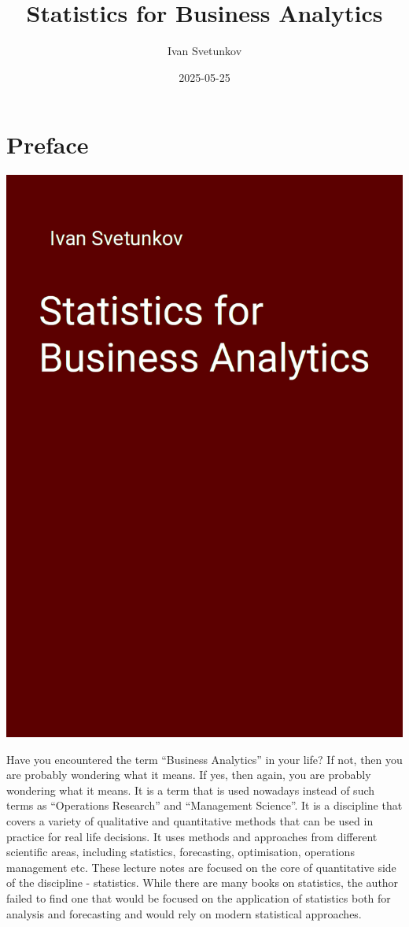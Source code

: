 \documentclass[
]{book}
\title{Statistics for Business Analytics}
\author{Ivan Svetunkov}
\date{2025-05-25}
\theoremstyle{definition}
\theoremstyle{definition}
\theoremstyle{definition}
\theoremstyle{definition}
\theoremstyle{remark}
\begin{document}
\maketitle

{
\setcounter{tocdepth}{1}
\tableofcontents
}
\chapter*{Preface}\label{preface}

\begin{center}\includegraphics[width=0.6\linewidth]{images/sba} \end{center}

Have you encountered the term ``Business Analytics'' in your life? If not, then you are probably wondering what it means. If yes, then again, you are probably wondering what it means. It is a term that is used nowadays instead of such terms as ``Operations Research'' and ``Management Science''. It is a discipline that covers a variety of qualitative and quantitative methods that can be used in practice for real life decisions. It uses methods and approaches from different scientific areas, including statistics, forecasting, optimisation, operations management etc. These lecture notes are focused on the core of quantitative side of the discipline - statistics. While there are many books on statistics, the author failed to find one that would be focused on the application of statistics both for analysis and forecasting and would rely on modern statistical approaches.
\end{document}
